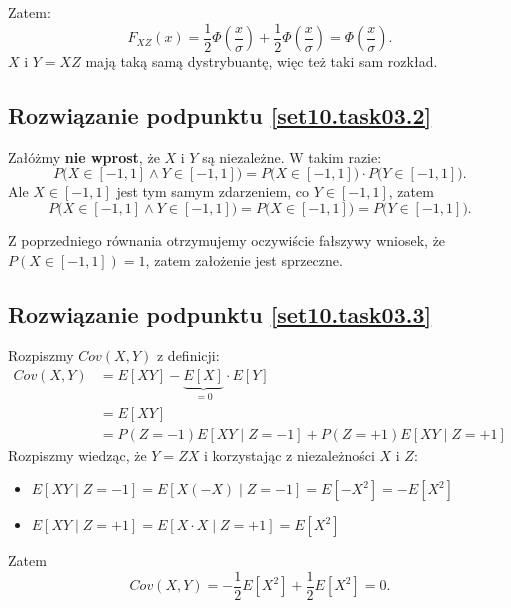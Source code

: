 Zatem:
\[
	F_{XZ}(x) = \frac{1}{2} \Phi\left( \frac{x}{\sigma} \right)
	+ \frac{1}{2} \Phi\left( \frac{x}{\sigma} \right)
	= \Phi\left( \frac{x}{\sigma} \right).
\]
\(X\) i \(Y = XZ\) mają taką samą dystrybuantę, więc też taki sam rozkład.

\subsection*{Rozwiązanie podpunktu \ref{set10.task03.2}}
Załóżmy \textbf{nie wprost}, że \(X\) i \(Y\) są niezależne.
W takim razie:
\[
	P\big(X \in [-1, 1] \land Y \in [-1, 1]\big)
	= P\big(X \in [-1, 1]\big) \cdot P\big(Y \in [-1, 1]\big).
\]
Ale \(X \in [-1, 1]\) jest tym samym zdarzeniem, co \(Y \in [-1, 1]\), zatem
\[
	P\big(X \in [-1, 1] \land Y \in [-1, 1]\big)
	= P\big(X \in [-1, 1]\big)
	= P\big(Y \in [-1, 1]\big).
\]

Z poprzedniego równania otrzymujemy oczywiście fałszywy wniosek,
że \(P(X \in [-1, 1]) = 1\), zatem założenie jest sprzeczne.

\subsection*{Rozwiązanie podpunktu \ref{set10.task03.3}}
Rozpiszmy \(Cov(X, Y)\) z definicji:
\begin{align*}
	Cov(X, Y)
	 & = E[X Y] - \underbrace{E[X]}_{=0} \cdot E[Y]                \\
	 & = E[X Y]                                                    \\
	 & = P(Z = -1) E[XY \mid Z = -1] + P(Z = +1) E[XY \mid Z = +1]
\end{align*}
Rozpiszmy wiedząc, że \(Y = ZX\) i korzystając z niezależności \(X\) i \(Z\):
\begin{itemize}
	\item \(E[XY \mid Z = -1]
	      = E[X (-X) \mid Z = -1]
	      = E[-X^2]
	      = -E[X^2]
	      \)
	\item \(E[XY \mid Z = +1]
	      = E[X \cdot X \mid Z = +1]
	      = E[X^2]
	      \)
\end{itemize}
Zatem
\[
	Cov(X, Y)
	= -\frac{1}{2} E[X^2] + \frac{1}{2} E[X^2]
	= 0.
\]
